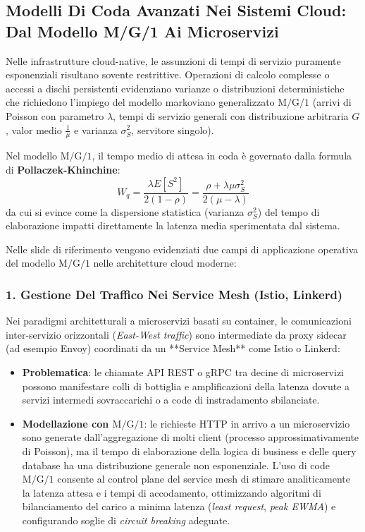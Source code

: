 \documentclass[11pt, a4paper]{article}
\begin{document}
\subsection{Modelli Di Coda Avanzati Nei Sistemi Cloud: Dal Modello M/G/1 Ai Microservizi}

Nelle infrastrutture cloud-native, le assunzioni di tempi di servizio puramente esponenziali risultano sovente restrittive. Operazioni di calcolo complesse o accessi a dischi persistenti evidenziano varianze o distribuzioni deterministiche che richiedono l'impiego del modello markoviano generalizzato $\text{M/G/1}$ (arrivi di Poisson con parametro $\lambda$, tempi di servizio generali con distribuzione arbitraria $G$, valor medio $\frac{1}{\mu}$ e varianza $\sigma_S^2$, servitore singolo).


Nel modello $\text{M/G/1}$, il tempo medio di attesa in coda è governato dalla formula di \textbf{Pollaczek-Khinchine}:
\[
W_q = \frac{\lambda E[S^2]}{2(1 - \rho)} = \frac{\rho + \lambda \mu \sigma_S^2}{2(\mu - \lambda)}
\]
da cui si evince come la dispersione statistica (varianza $\sigma_S^2$) del tempo di elaborazione impatti direttamente la latenza media sperimentata dal sistema.

Nelle slide di riferimento vengono evidenziati due campi di applicazione operativa del modello $\text{M/G/1}$ nelle architetture cloud moderne:

\subsubsection{1. Gestione Del Traffico Nei Service Mesh (Istio, Linkerd)}

Nei paradigmi architetturali a microservizi basati su container, le comunicazioni inter-servizio orizzontali (\emph{East-West traffic}) sono intermediate da proxy sidecar (ad esempio Envoy) coordinati da un **Service Mesh** come Istio o Linkerd:
\begin{itemize}[noitemsep]
    \item \textbf{Problematica}: le chiamate API REST o gRPC tra decine di microservizi possono manifestare colli di bottiglia e amplificazioni della latenza dovute a servizi intermedi sovraccarichi o a code di instradamento sbilanciate.
    \item \textbf{Modellazione con $\text{M/G/1}$}: le richieste HTTP in arrivo a un microservizio sono generate dall'aggregazione di molti client (processo approssimativamente di Poisson), ma il tempo di elaborazione della logica di business e delle query database ha una distribuzione generale non esponenziale. L'uso di code $\text{M/G/1}$ consente al control plane del service mesh di stimare analiticamente la latenza attesa e i tempi di accodamento, ottimizzando algoritmi di bilanciamento del carico a minima latenza (\emph{least request}, \emph{peak EWMA}) e configurando soglie di \emph{circuit breaking} adeguate.
\end{itemize}
\end{document}
